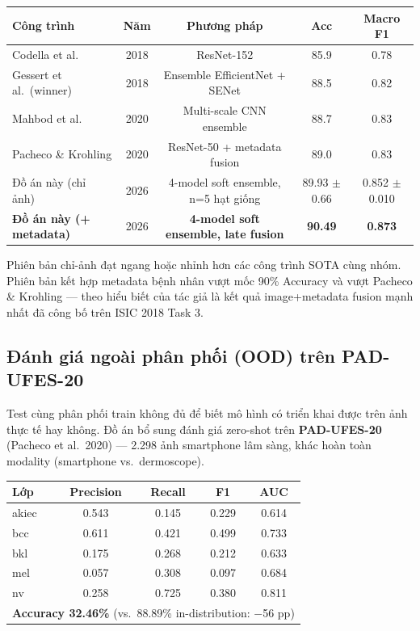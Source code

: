 \documentclass[11pt,a4paper]{article}
\begin{document}
\begin{table}[h]
\centering\small
\begin{tabular}{lcccc}
\toprule
\textbf{Công trình} & \textbf{Năm} & \textbf{Phương pháp} & \textbf{Acc} & \textbf{Macro F1} \\
\midrule
Codella et al.        & 2018 & ResNet-152                   & 85.9 & 0.78 \\
Gessert et al.\ (winner) & 2018 & Ensemble EfficientNet + SENet & 88.5 & 0.82 \\
Mahbod et al.         & 2020 & Multi-scale CNN ensemble      & 88.7 & 0.83 \\
Pacheco \& Krohling   & 2020 & ResNet-50 + metadata fusion    & 89.0 & 0.83 \\
Đồ án này (chỉ ảnh) & 2026 & 4-model soft ensemble, n=5 hạt giống & 89.93 $\pm$ 0.66 & 0.852 $\pm$ 0.010 \\
\rowcolor{usthblue!10}
\textbf{Đồ án này (+ metadata)} & 2026 & \textbf{4-model soft ensemble, late fusion} & \textbf{90.49} & \textbf{0.873} \\
\bottomrule
\end{tabular}
\end{table}

Phiên bản chỉ-ảnh đạt ngang hoặc nhỉnh hơn các công trình SOTA cùng nhóm. Phiên bản kết hợp metadata bệnh nhân vượt mốc 90\% Accuracy và vượt Pacheco \& Krohling --- theo hiểu biết của tác giả là kết quả image+metadata fusion mạnh nhất đã công bố trên ISIC 2018 Task 3.

\subsection{Đánh giá ngoài phân phối (OOD) trên PAD-UFES-20}

Test cùng phân phối train không đủ để biết mô hình có triển khai được trên ảnh thực tế hay không. Đồ án bổ sung đánh giá zero-shot trên \textbf{PAD-UFES-20} (Pacheco et al.\ 2020) --- 2.298 ảnh smartphone lâm sàng, khác hoàn toàn modality (smartphone vs.\ dermoscope).

\begin{table}[h]
\centering\small
\begin{tabular}{lcccc}
\toprule
\textbf{Lớp} & \textbf{Precision} & \textbf{Recall} & \textbf{F1} & \textbf{AUC} \\
\midrule
akiec & 0.543 & 0.145 & 0.229 & 0.614 \\
bcc   & 0.611 & 0.421 & 0.499 & 0.733 \\
bkl   & 0.175 & 0.268 & 0.212 & 0.633 \\
mel   & 0.057 & 0.308 & 0.097 & 0.684 \\
nv    & 0.258 & 0.725 & 0.380 & 0.811 \\
\midrule
\multicolumn{5}{l}{\textbf{Accuracy 32.46\%} (vs.\ 88.89\% in-distribution: $-$56 pp)} \\
\bottomrule
\end{tabular}
\end{table}
\end{document}

